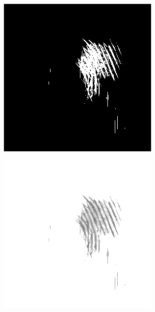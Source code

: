 \documentclass{beamer}
\begin{document}
{\begin{figure}[!ht]
\begin{subfigure}[ht]{0.15\textwidth}
        \end{subfigure}
        \qquad
        \begin{subfigure}[ht]{0.15\textwidth}
            \includegraphics[width=\textwidth]{fingerprints/2000Db1a/2_6_mask.jpg}
        \end{subfigure}
        \qquad
        \begin{subfigure}[ht]{0.15\textwidth}
            \includegraphics[width=\textwidth]{fingerprints/2000Db1a/2_6_filtered.jpg}

\end{subfigure}
\end{figure}}
\end{document}
